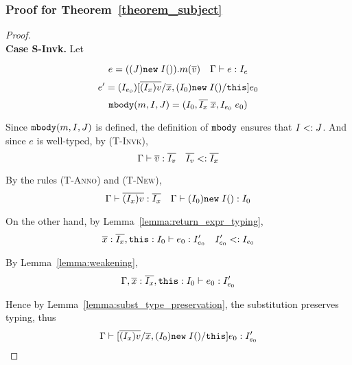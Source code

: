 \subsubsection{Proof for Theorem~\ref{theorem_subject}}
\begin{proof} ~\\
\indent \textbf{Case S-Invk.} Let
\begin{comment}
   $$e = (\angl{J}\new{I}).m(\overline{v}) \quad \judgeewf {\Gamma} {e : I_e}$$
   $$e' = (\angl{J}\new{I}).J?m(\overline{v})$$
   
Since $e$ is well-typed, $\angl{J}\new{I}$ is also well-typed. By \textsc{(T-Anno)},
  $$\judgeewf {\Gamma} {\angl{J}\new{I} : J} \quad I \subtype J$$
  
By \textsc{(T-Invk)} on $e$,
  $$\mbody(m, J, J) = (\_, \overline{I_x}\ \_, I_e\ \_) \quad \judgeewf {\Gamma} {\overline{v} : \overline{I_v}} \quad \overline{I_v}  \subtype \overline{I_x}$$
  
At this moment, \textsc{(T-PathInvk)} is immediately applicable by the above conditions, including that $e'$ also invokes $\mbody(m, J, J)$. Hence $\judgeewf {\Gamma} {e' : I_e}$.
\textbf{Case S-PathInvk.} Let
\end{comment}
  $$e = ((J)\texttt{new} \; I()).m(\overline{v}) \quad \Gamma \; {\vdash} \; e : I_e$$
  $$e' = (I_{e_0})[\overline{(I_x)v}/\overline{x}, (I_0)\texttt{new} \; I()/\texttt{this}]e_0$$
  $$\texttt{mbody}(m, I, J) = (I_0, \overline{I_x} \; \overline{x}, I_{e_0} \; e_0)$$

Since $\texttt{mbody}(m, I, J)$ is defined, the definition of $\texttt{mbody}$ ensures that $I <: J$. And since $e$ is well-typed, by \textsc{(T-Invk)},
  $$\Gamma \; {\vdash} \; \overline{v} : \overline{I_v} \quad \overline{I_v} <: \overline{I_x}$$

By the rules \textsc{(T-Anno)} and  \textsc{(T-New)},
  $$\Gamma \; {\vdash} \; \overline{(I_x)v} : \overline{I_x} \quad \Gamma \; {\vdash} \; (I_0)\texttt{new} \; I() : I_0$$
  
On the other hand, by Lemma~\ref{lemma:return_expr_typing},
  $$\overline{x} : \overline{I_x}, \texttt{this}: I_0 \; {\vdash} \; e_0 : I'_{e_0} \quad I'_{e_0} <: I_{e_0}$$
  
By Lemma~\ref{lemma:weakening},
  $$\Gamma, \overline{x} : \overline{I_x}, \texttt{this}: I_0 \; {\vdash} \; e_0 : I'_{e_0}$$

Hence by Lemma~\ref{lemma:subst_type_preservation}, the substitution preserves typing, thus
  $$\Gamma \; {\vdash} \; [\overline{(I_x)v}/\overline{x}, (I_0)\texttt{new} \; I()/\texttt{this}]e_0 : I'_{e_0}$$
  

\end{proof}
